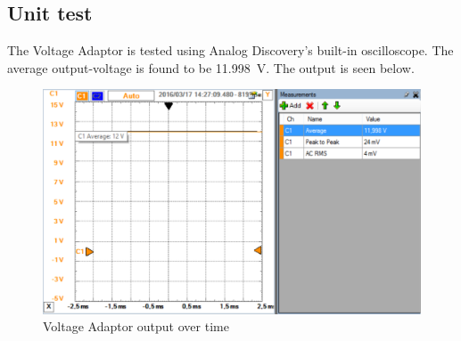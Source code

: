 \subsection{Unit test}  
The Voltage Adaptor is tested using Analog Discovery's built-in oscilloscope. The average output-voltage is found to be \SI{11.998}{\volt}. The output is seen below.

\begin{figure}[H]
	\centering
	\includegraphics[width=0.9\linewidth]{Hardware/Pictures/VoltageAdaptor_test}
	\caption{Voltage Adaptor output over time}
	\label{fig:VoltageAdaptor_test}
\end{figure}